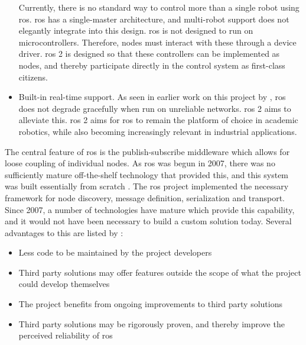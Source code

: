 \documentclass[\rootfolder/main.tex]{subfiles}
\begin{document}
\begin{itemize}
        Currently, there is no standard way to control more than a single robot using \acrshort{ros}.
        \acrshort{ros} has a single-master architecture, and multi-robot support does not elegantly integrate into this design.
        \acrshort{ros} is not designed to run on microcontrollers. Therefore, nodes must interact with these through a device driver.
        \acrshort{ros} 2 is designed so that these controllers can be implemented as nodes, and thereby participate directly in the control system as first-class citizens.
    \item{Built-in real-time support.}
        As seen in earlier work on this project by \cite{Waløen2017}, \acrshort{ros} does not degrade gracefully when run on unreliable networks.
        \acrshort{ros} 2 aims to alleviate this.
        \acrshort{ros} 2 aims for \acrshort{ros} to remain the platform of choice in academic robotics, while also becoming increasingly relevant in industrial applications.
\end{itemize}

The central feature of \acrshort{ros} is the publish-subscribe middleware which allows for loose coupling of individual nodes.
As \acrshort{ros} was begun in 2007, there was no sufficiently mature off-the-shelf technology that provided this, and this system was built essentially from scratch \cite{Gerkey2017}.
The \acrshort{ros} project implemented the necessary framework for node discovery, message definition, serialization and transport.
Since 2007, a number of technologies have mature which provide this capability, and it would not have been necessary to build a custom solution today.
Several advantages to this are listed by \cite{Gerkey2017}:

\begin{itemize}
    \item Less code to be maintained by the project developers
    \item Third party solutions may offer features outside the scope of what the project could develop themselves
    \item The project benefits from ongoing improvements to third party solutions
    \item Third party solutions may be rigorously proven, and thereby improve the perceived reliability of \acrshort{ros}
\end{itemize}
\end{document}
